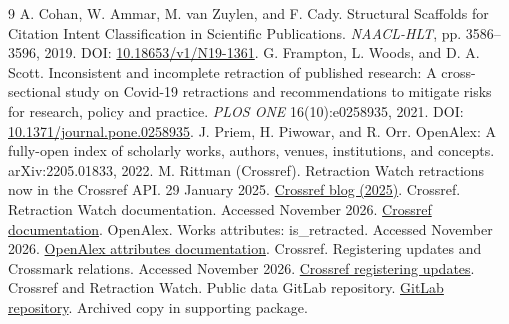 \documentclass[10pt,a4paper,twocolumn]{article}
\begin{document}
\begin{thebibliography}{9}
 A. Cohan, W. Ammar, M. van Zuylen, and F. Cady. Structural Scaffolds for Citation Intent Classification in Scientific Publications. \emph{NAACL-HLT}, pp. 3586--3596, 2019. DOI: \href{https://doi.org/10.18653/v1/N19-1361}{10.18653/v1/N19-1361}.
 G. Frampton, L. Woods, and D. A. Scott. Inconsistent and incomplete retraction of published research: A cross-sectional study on Covid-19 retractions and recommendations to mitigate risks for research, policy and practice. \emph{PLOS ONE} 16(10):e0258935, 2021. DOI: \href{https://doi.org/10.1371/journal.pone.0258935}{10.1371/journal.pone.0258935}.
 J. Priem, H. Piwowar, and R. Orr. OpenAlex: A fully-open index of scholarly works, authors, venues, institutions, and concepts. arXiv:2205.01833, 2022.
 M. Rittman (Crossref). Retraction Watch retractions now in the Crossref API. 29 January 2025. \href{https://www.crossref.org/blog/retraction-watch-retractions-now-in-the-crossref-api/}{Crossref blog (2025)}.
 Crossref. Retraction Watch documentation. Accessed November 2026. \href{https://www.crossref.org/documentation/retrieve-metadata/retraction-watch/}{Crossref documentation}.
 OpenAlex. Works attributes: is\_retracted. Accessed November 2026. \href{https://help.openalex.org/data/works/attributes/}{OpenAlex attributes documentation}.
 Crossref. Registering updates and Crossmark relations. Accessed November 2026. \href{https://www.crossref.org/documentation/register-maintain-records/maintaining-your-metadata/registering-updates/}{Crossref registering updates}.
 Crossref and Retraction Watch. Public data GitLab repository. \href{https://gitlab.com/crossref/retraction-watch-data}{GitLab repository}. Archived copy in supporting package.
\end{thebibliography}
\end{document}
